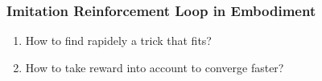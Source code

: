 \documentclass{beamer}
\begin{document}
\frame
{
  \frametitle{\alert{Imitation Reinforcement Loop} in Embodiment}

  \begin{center}
  \end{center}
  \begin{enumerate}
  \item<+-> How to find \alert{rapidely a trick that fits}?
  \item<+-> How to \alert{take reward into account} to \alert{converge faster}?
  \end{enumerate}

}
\end{document}
